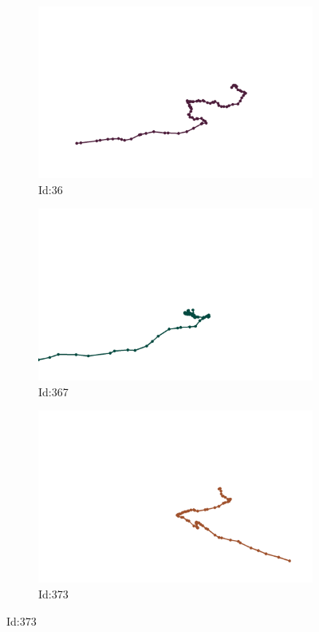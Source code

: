 \documentclass[12pt,twoside]{report}
\begin{document}
\begin{figure}
\centering
\begin{subfigure}[b]{0.20\textwidth}
\centering
\includegraphics[width=\textwidth]{../../trajectories/36.png}
\caption{Id:36}
\end{subfigure}
\begin{subfigure}[b]{0.20\textwidth}
\centering
\includegraphics[width=\textwidth]{../../trajectories/367.png}
\caption{Id:367}
\end{subfigure}
\begin{subfigure}[b]{0.20\textwidth}
\centering
\includegraphics[width=\textwidth]{../../trajectories/373.png}
\caption{Id:373}
\end{subfigure}
\end{figure}
\end{document}
